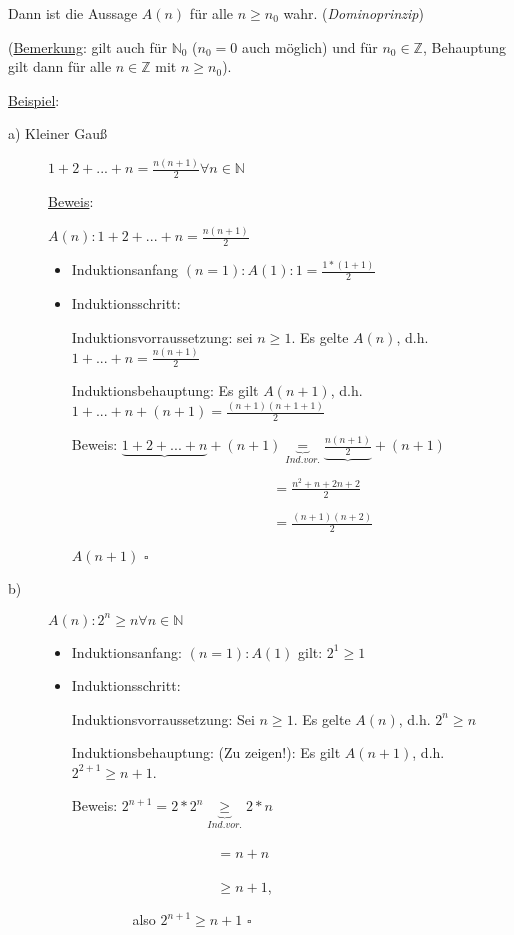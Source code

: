 \documentclass[a4paper, 12pt, twoside] {article}
\begin{document}
Dann ist die Aussage $A(n)$ für alle $n \geq n_0$ wahr. (\textit{Dominoprinzip})

(\underline{Bemerkung}: gilt auch für $\mathbb{N}_0$ ($n_0 = 0$ auch möglich) und für $n_0 \in \mathbb{Z}$, Behauptung gilt dann für alle $n \in \mathbb{Z}$ mit $n \geq n_0$).

\underline{Beispiel}: 

\begin{description}

\item[a) Kleiner Gauß]
$1 + 2 + ... + n = \frac{n(n+1)}{2} \forall n \in \mathbb{N}$

\underline{Beweis}:

$A(n) : 1 + 2 + ... + n = \frac{n(n+1)}{2}$

\begin{itemize}
\item Induktionsanfang $(n = 1): A(1): 1 = \frac{1*(1+1)}{2}$
\item Induktionsschritt:

Induktionsvorraussetzung: sei $n \geq 1$. Es gelte $A(n)$, d.h. $1+ ... +n = \frac{n(n+1)}{2}$

Induktionsbehauptung: Es gilt $A(n+1)$, d.h. $1+ ... +n + (n+1) = \frac{(n+1) (n+1 + 1)}{2}$

Beweis: $\underbrace{1 + 2 + ... + n}_{} + (n+1) \underbrace{=}_{Ind.vor.} \underbrace{\frac{n(n+1)}{2}} + (n+1)$

$\qquad\qquad\qquad\qquad\qquad\qquad\qquad$ \space
$ = \frac{n^2 + n + 2n + 2}{2}$

$\qquad\qquad\qquad\qquad\qquad\qquad\qquad$ \space
$=\frac{(n+1)(n+2)}{2}$

$A(n+1)$ \hfill $\square$

\end{itemize}

\item[b)]

$A(n): 2^n \geq n \forall n \in \mathbb{N}$
\begin{itemize}
\item Induktionsanfang: $(n = 1 ) : A(1)$ gilt: $2^1 \geq 1$
\item Induktionsschritt:

Induktionsvorraussetzung: Sei $n \geq 1$. Es gelte $A(n)$, d.h. $2^n \geq n$

Induktionsbehauptung: (Zu zeigen!): Es gilt $A(n+1)$, d.h. $2^{2+1} \geq n+1$.

Beweis: $2^{n+1} = 2*2^n \underbrace{\geq}_{Ind.vor.} 2 * n$

$\qquad\qquad\qquad\qquad\qquad$
$= n + n$

$\qquad\qquad\qquad\qquad\qquad$
$\geq n + 1$,

$\qquad\qquad$
also \qquad $2^{n+1} \geq n+1$ \hfill $\square$
\end{itemize}

\end{description}
\end{document}
